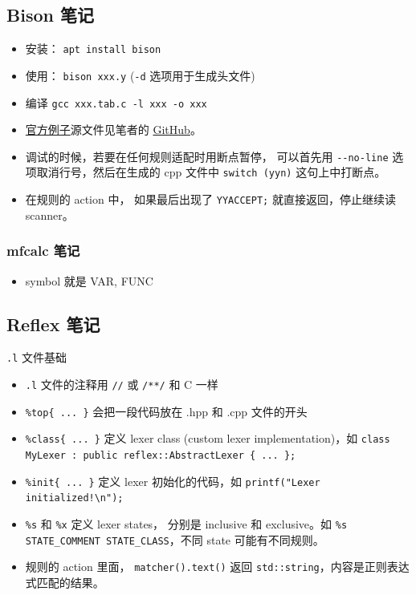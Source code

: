 \subsection{Bison 笔记}
\begin{itemize}
\item 安装： \verb`apt install bison`
\item 使用： \verb`bison xxx.y` (\verb`-d` 选项用于生成头文件)
\item 编译 \verb`gcc xxx.tab.c -l xxx -o xxx`
\item \href{http://web.mit.edu/gnu/doc/html/bison_5.html}{官方例子}源文件见笔者的 \href{https://github.com/MacroUniverse/bison_test}{GitHub}。
\item 调试的时候，若要在任何规则适配时用断点暂停， 可以首先用 \verb`--no-line` 选项取消行号，然后在生成的 cpp 文件中 \verb`switch (yyn)` 这句上中打断点。
\item 在规则的 action 中， 如果最后出现了 \verb`YYACCEPT;` 就直接返回，停止继续读 scanner。
\end{itemize}

\subsubsection{mfcalc 笔记}
\begin{itemize}
\item symbol 就是 VAR, FUNC
\end{itemize}

\subsection{Reflex 笔记}
\verb`.l` 文件基础
\begin{itemize}
\item \verb`.l` 文件的注释用 \verb`//` 或 \verb`/**/` 和 C 一样
\item \verb`%top{ ... }` 会把一段代码放在 .hpp 和 .cpp 文件的开头
\item \verb`%class{ ... }` 定义 lexer class (custom lexer implementation)，如 \verb`class MyLexer : public reflex::AbstractLexer { ... };`
\item \verb`%init{ ... }` 定义 lexer 初始化的代码，如 \verb`printf("Lexer initialized!\n");`
\item \verb`%s` 和 \verb`%x` 定义 lexer states， 分别是 inclusive 和 exclusive。如 \verb`%s STATE_COMMENT STATE_CLASS`，不同 state 可能有不同规则。
\item 规则的 action 里面， \verb`matcher().text()` 返回 \verb`std::string`，内容是正则表达式匹配的结果。
\end{itemize}
